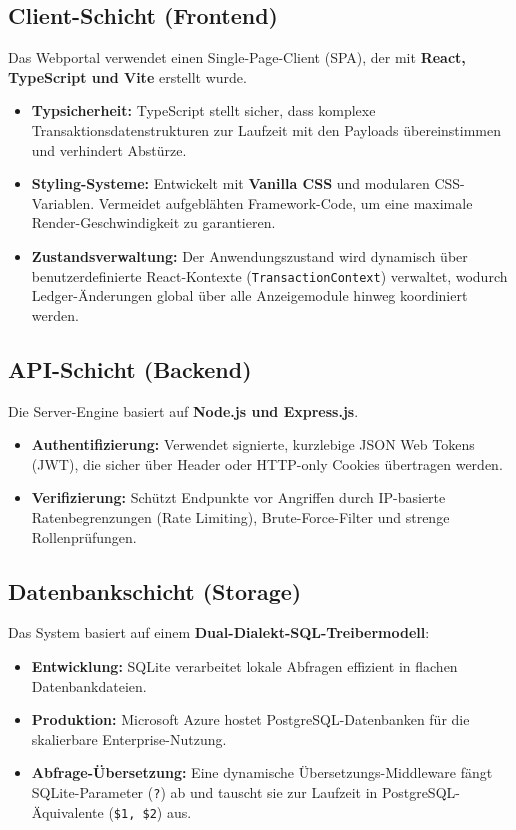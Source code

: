 \documentclass[11pt,a4paper]{article}
\begin{document}
\subsection{Client-Schicht (Frontend)}
Das Webportal verwendet einen Single-Page-Client (SPA), der mit \textbf{React, TypeScript und Vite} erstellt wurde.
\begin{itemize}
    \item \textbf{Typsicherheit:} TypeScript stellt sicher, dass komplexe Transaktionsdatenstrukturen zur Laufzeit mit den Payloads übereinstimmen und verhindert Abstürze.
    \item \textbf{Styling-Systeme:} Entwickelt mit \textbf{Vanilla CSS} und modularen CSS-Variablen. Vermeidet aufgeblähten Framework-Code, um eine maximale Render-Geschwindigkeit zu garantieren.
    \item \textbf{Zustandsverwaltung:} Der Anwendungszustand wird dynamisch über benutzerdefinierte React-Kontexte (\texttt{TransactionContext}) verwaltet, wodurch Ledger-Änderungen global über alle Anzeigemodule hinweg koordiniert werden.
\end{itemize}

\subsection{API-Schicht (Backend)}
Die Server-Engine basiert auf \textbf{Node.js und Express.js}.
\begin{itemize}
    \item \textbf{Authentifizierung:} Verwendet signierte, kurzlebige JSON Web Tokens (JWT), die sicher über Header oder HTTP-only Cookies übertragen werden.
    \item \textbf{Verifizierung:} Schützt Endpunkte vor Angriffen durch IP-basierte Ratenbegrenzungen (Rate Limiting), Brute-Force-Filter und strenge Rollenprüfungen.
\end{itemize}

\subsection{Datenbankschicht (Storage)}
Das System basiert auf einem \textbf{Dual-Dialekt-SQL-Treibermodell}:
\begin{itemize}
    \item \textbf{Entwicklung:} SQLite verarbeitet lokale Abfragen effizient in flachen Datenbankdateien.
    \item \textbf{Produktion:} Microsoft Azure hostet PostgreSQL-Datenbanken für die skalierbare Enterprise-Nutzung.
    \item \textbf{Abfrage-Übersetzung:} Eine dynamische Übersetzungs-Middleware fängt SQLite-Parameter (\texttt{?}) ab und tauscht sie zur Laufzeit in PostgreSQL-Äquivalente (\texttt{\$1, \$2}) aus.
\end{itemize}
\end{document}
